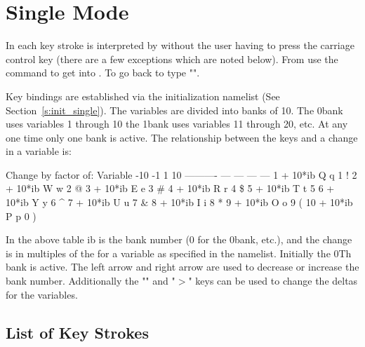 \chapter{Single Mode}
\label{c:single}

In  each key stroke is interpreted by \tao without the user having to press 
the carriage control key (there are a few exceptions which are noted below). From 
use the  command to get into . To go back to  type
"".

Key bindings are established via the  initialization namelist 
(See Section~\ref{s:init_single}). 
The variables are divided into banks of 10. The 0\Th bank uses variables 1
through 10 the 1\St bank uses variables 11 through 20, etc. 
At any one time only one bank is active. The relationship between
the keys and a change in a variable is:
\begin{example}
                 Change by factor of:          
     Variable    -10  -1    1   10
   ----------    ---  ---  ---  ---
    1 + 10*ib     Q    q    1    !   
    2 + 10*ib     W    w    2    @    
    3 + 10*ib     E    e    3    \#   
    4 + 10*ib     R    r    4    \$   
    5 + 10*ib     T    t    5    %
    6 + 10*ib     Y    y    6    ^   
    7 + 10*ib     U    u    7    \&
    8 + 10*ib     I    i    8    *   
    9 + 10*ib     O    o    9    (   
   10 + 10*ib     P    p    0    )   
\end{example}
In the above table ib is the bank number (0 for the 0\Th bank, etc.),
and the change is in multiples of the  for a variable as
specified in the  namelist. Initially the 0Th bank is
active. The left arrow and right arrow are used to decrease or
increase the bank number.  Additionally the "\vn{<}" and "$>$" keys
can be used to change the deltas for the variables.

\section{List of Key Strokes}
\label{s:keys}

